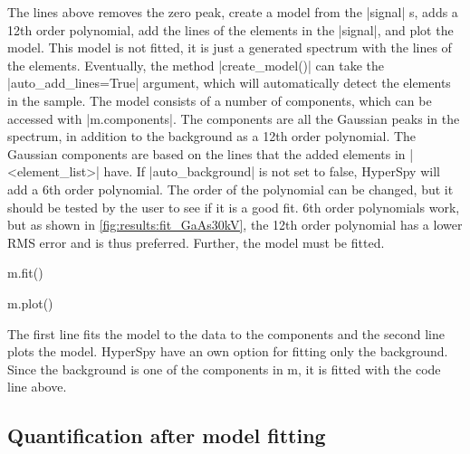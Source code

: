 The lines above removes the zero peak, create a model from the \cverb|signal| s, adds a 12th order polynomial, add the lines of the elements in the \cverb|signal|, and plot the model.
This model is not fitted, it is just a generated spectrum with the lines of the elements.
Eventually, the method \cverb|create_model()| can take the \cverb|auto_add_lines=True| argument, which will automatically detect the elements in the sample.
The model consists of a number of components, which can be accessed with \cverb|m.components|.
The components are all the Gaussian peaks in the spectrum, in addition to the background as a 12th order polynomial.
The Gaussian components are based on the lines that the added elements in \cverb|<element_list>| have.
If \cverb|auto_background| is not set to false, HyperSpy will add a 6th order polynomial.
The order of the polynomial can be changed, but it should be tested by the user to see if it is a good fit.
6th order polynomials work, but as shown in \cref{fig:results:fit_GaAs30kV}, the 12th order polynomial has a lower RMS error and is thus preferred.
Further, the model must be fitted.



\begin{lcverbatim}
    m.fit()

    m.plot()
\end{lcverbatim}

The first line fits the model to the data to the components and the second line plots the model.
HyperSpy have an own option for fitting only the background.
Since the background is one of the components in m, it is fitted with the code line above.






\subsection{Quantification after model fitting}
\label{sec:discussion:steps:quantification:model}




